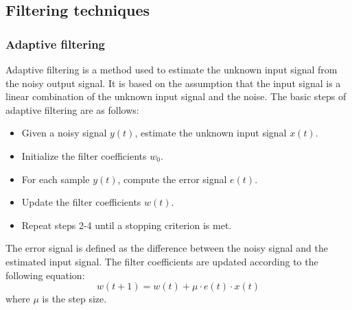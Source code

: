 \documentclass[a4paper]{sapthesis}
\begin{document}
\subsection{Filtering techniques} \label{sec:filtering}
\subsubsection{Adaptive filtering}
Adaptive filtering\cite{adaptive} is a method used to estimate the
unknown input signal from the noisy output signal. It is based on the
assumption that the input signal is a linear combination of the unknown
input signal and the noise. \newline
The basic steps of adaptive filtering are as follows:
\begin{itemize}
    \item Given a noisy signal $y(t)$, estimate the unknown input signal
    $x(t)$.
    \item Initialize the filter coefficients $w_0$.
    \item For each sample $y(t)$, compute the error signal $e(t)$.
    \item Update the filter coefficients $w(t)$.
    \item Repeat steps 2-4 until a stopping criterion is met.
    
\end{itemize}
The error signal is defined as the difference between the noisy signal
and the estimated input signal. The filter coefficients are updated
according to the following equation:
\begin{equation}
\label{eq:adaptive}
w(t+1) = w(t) + \mu \cdot e(t) \cdot x(t)
\end{equation}
where $\mu$ is the step size. \newline
\end{document}
